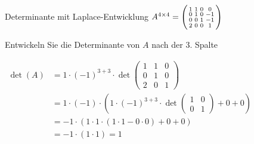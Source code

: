 \begin{example2}{Determinante} mit Laplace-Entwicklung
    $A^{4 \times 4} = \begin{psmallmatrix}
        1 & 1 & 0 & 0 \\
        0 & 1 & 0 & -1 \\
        0 & 0 & 1 & -1 \\
        2 & 0 & 0 & 1
    \end{psmallmatrix}$

    Entwickeln Sie die Determinante von $A$ nach der 3. Spalte

    $
    \begin{aligned}
    \operatorname{det}(A) & =1 \cdot(-1)^{3+3} \cdot \operatorname{det}\left(\begin{array}{ccc}1 & 1 & 0 \\ 0 & 1 & 0 \\ 2 & 0 & 1\end{array}\right) \\
    & =1 \cdot(-1) \cdot\left(1 \cdot(-1)^{3+3} \cdot \operatorname{det}\left(\begin{array}{cc}1 & 0 \\ 0 & 1\end{array}\right)+0+0\right) \\
    & =-1 \cdot\left(1 \cdot 1 \cdot(1 \cdot 1-0 \cdot 0)+0+0\right) \\
    & =-1 \cdot(1 \cdot 1)=1
    \end{aligned}
    $
\end{example2}

